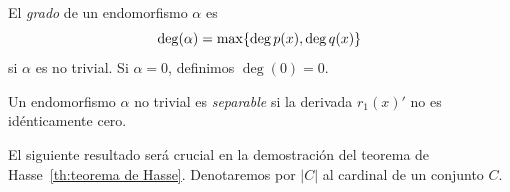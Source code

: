 \begin{definicion}
	El \emph{grado} de un endomorfismo $\alpha$ es
	$$
		\deg(\alpha)= \max \{ \deg p(x) , \deg q(x) \}
	$$
	si $\alpha$ es no trivial. Si $\alpha = 0$, definimos $\deg(0) = 0$.
\end{definicion}

\begin{definicion}
	Un endomorfismo $\alpha$ no trivial es \emph{separable} si la derivada $r_1(x)'$ no es idénticamente cero.

\end{definicion}

El siguiente resultado será crucial en la demostración del teorema de Hasse~\ref{th:teorema de Hasse}. Denotaremos por  $\left\vert{C}\right\vert$ al cardinal de un conjunto $C$.

